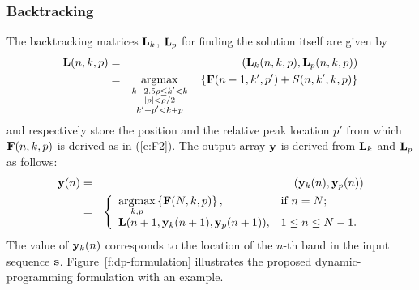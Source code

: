 \subsubsection{Backtracking}
The backtracking matrices ${\mathbf{L}}_k$, ${\mathbf{L}}_p$ for finding the solution itself are given by
\begin{eqnarray}\label{e:L}
\bL(n,k,p)&=&(\bL_k(n,k,p), \bL_p(n,k,p)) \\
&=&\argmax_{\substack{k-2.5\rho \le k' < k\\|p| < \rho/2\\k'+p' < k+p}}\quad \left\{ \bF(n-1,k',p') + S(n,k',k,p) \right\} \nonumber
\end{eqnarray}
and respectively store the position  and the relative peak location $p'$ from which ${\mathbf{F}}(n,k,p)$ is derived as in (\ref{e:F2}). The output array ${\mathbf{y}}$ is derived from ${\mathbf{L}}_k$ and ${\mathbf{L}}_p$ as follows:
%
\begin{eqnarray}\label{e:y}
\by(n) & = & (\by_k(n), \by_p(n)) \\
& = & \left\{
  \begin{array}{ll} \nonumber
    \argmax\limits_{k,p} \left\{\bF(N,k,p)\right\}, & \hbox{if $n = N$;} \\
    \bL(n+1, \by_k(n+1), \by_p(n+1)), & \hbox{$1 \le n \le N-1$.}
  \end{array}
\right.
\end{eqnarray}
%
The value of ${\mathbf{y}}_k(n)$ corresponds to the location of the $n$-th band in the input sequence ${\mathbf{s}}$. Figure~\ref{f:dp-formulation} illustrates the proposed dynamic-programming formulation with an example.


